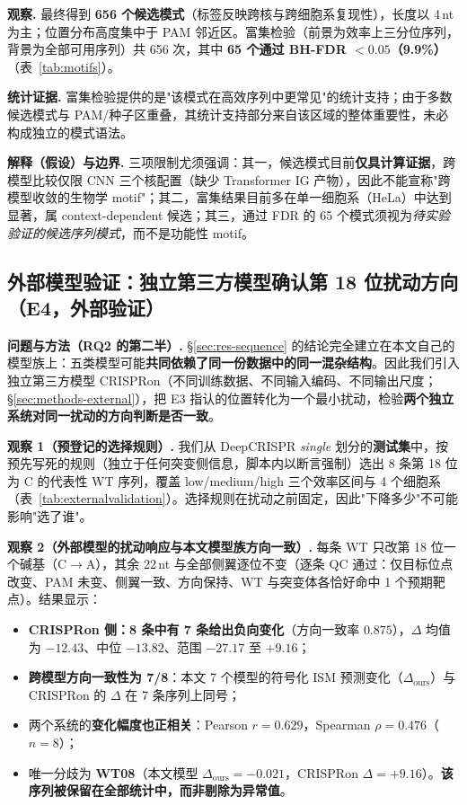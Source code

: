 \textbf{观察.} 最终得到 \textbf{656 个候选模式}（标签反映跨核与跨细胞系复现性），长度以 4\,nt 为主；位置分布高度集中于 PAM 邻近区。富集检验（前景为效率上三分位序列，背景为全部可用序列）共 656 次，其中 \textbf{65 个通过 BH-FDR $<0.05$（9.9\%）}（表~\ref{tab:motifs}）。

\textbf{统计证据.} 富集检验提供的是"该模式在高效序列中更常见"的统计支持；由于多数候选模式与 PAM/种子区重叠，其统计支持部分来自该区域的整体重要性，未必构成独立的模式语法。

\textbf{解释（假设）与边界.} 三项限制尤须强调：其一，候选模式目前\textbf{仅具计算证据}，跨模型比较仅限 CNN 三个核配置（缺少 Transformer IG 产物），因此不能宣称"跨模型收敛的生物学 motif"；其二，富集结果目前多在单一细胞系（HeLa）中达到显著，属 context-dependent 候选；其三，通过 FDR 的 65 个模式须视为\emph{待实验验证的候选序列模式}，而不是功能性 motif。



\subsection{外部模型验证：独立第三方模型确认第 18 位扰动方向（E4，外部验证）}
\label{sec:res-external}

\textbf{问题与方法（RQ2 的第二半）.} \S\ref{sec:res-sequence} 的结论完全建立在本文自己的模型族上：五类模型可能\textbf{共同依赖了同一份数据中的同一混杂结构}。因此我们引入独立第三方模型 CRISPRon（不同训练数据、不同输入编码、不同输出尺度；\S\ref{sec:methods-external}），把 E3 指认的位置转化为一个最小扰动，检验\textbf{两个独立系统对同一扰动的方向判断是否一致}。

\textbf{观察 1（预登记的选择规则）.} 我们从 DeepCRISPR \emph{single} 划分的\textbf{测试集}中，按预先写死的规则（独立于任何突变侧信息，脚本内以断言强制）选出 8 条第 18 位为 C 的代表性 WT 序列，覆盖 low/medium/high 三个效率区间与 4 个细胞系（表~\ref{tab:externalvalidation}）。选择规则在扰动之前固定，因此"下降多少"不可能影响"选了谁"。

\textbf{观察 2（外部模型的扰动响应与本文模型族方向一致）.} 每条 WT 只改第 18 位一个碱基（C$\rightarrow$A），其余 22\,nt 与全部侧翼逐位不变（逐条 QC 通过：仅目标位点改变、PAM 未变、侧翼一致、方向保持、WT 与突变体各恰好命中 1 个预期靶点）。结果显示：

\begin{itemize}
\item \textbf{CRISPRon 侧：8 条中有 7 条给出负向变化}（方向一致率 $0.875$），$\Delta$ 均值为 $-12.43$、中位 $-13.82$、范围 $-27.17$ 至 $+9.16$；
\item \textbf{跨模型方向一致性为 7/8}：本文 7 个模型的符号化 ISM 预测变化（$\Delta_{\text{ours}}$）与 CRISPRon 的 $\Delta$ 在 7 条序列上同号；
\item 两个系统的\textbf{变化幅度也正相关}：Pearson $r=0.629$，Spearman $\rho=0.476$（$n=8$）；
\item 唯一分歧为 \textbf{WT08}（本文模型 $\Delta_{\text{ours}}=-0.021$，CRISPRon $\Delta=+9.16$）。\textbf{该序列被保留在全部统计中，而非剔除为异常值}。
\end{itemize}

